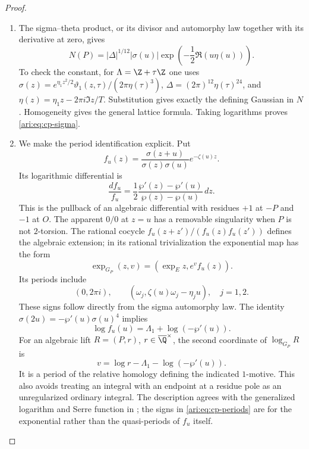 \begin{proof}
\begin{enumerate}[label=\arabic*.,leftmargin=*]
\item The sigma--theta product, or its divisor and automorphy law
together with its derivative at zero, gives
\begin{equation}\label{ari:eq:cp-klein}
 N(P)=|\Delta|^{1/12}|\sigma(u)|
                   \exp\!\left(-\frac12\Re(u\eta(u))\right).
\end{equation}
To check the constant, for $\Lambda=\Z+\tau\Z$ one uses
$\sigma(z)=e^{\eta_1z^2/2}\vartheta_1(z,\tau)/(2\pi\eta(\tau)^3)$,
$\Delta=(2\pi)^{12}\eta(\tau)^{24}$, and
$\eta(z)=\eta_1z-2\pi i\Im z/T$. Substitution gives exactly
the defining Gaussian in $N$. Homogeneity gives the general
lattice formula. Taking logarithms proves \eqref{ari:eq:cp-sigma}.

\item We make the period identification explicit. Put
\[
 f_u(z)=\frac{\sigma(z+u)}{\sigma(z)\sigma(u)}e^{-\zeta(u)z}.
\]
Its logarithmic differential is
\[
 \frac{df_u}{f_u}
 =\frac12\frac{\wp'(z)-\wp'(u)}{\wp(z)-\wp(u)}\,dz.
\]
This is the pullback of an algebraic differential with residues
$+1$ at $-P$ and $-1$ at $O$. The apparent $0/0$ at $z=u$
has a removable singularity when $P$ is not $2$-torsion.
The rational cocycle $f_u(z+z')/(f_u(z)f_u(z'))$ defines
the algebraic extension; in its rational trivialization the
exponential map has the form
\[
 \exp_{G_P}(z,v)=(\exp_E z,e^v f_u(z)).
\]
Its periods include
\begin{equation}\label{ari:eq:cp-periods}
 (0,2\pi i),\qquad
 (\omega_j,\zeta(u)\omega_j-\eta_j u),\quad j=1,2.
\end{equation}
These signs follow directly from the sigma automorphy law.
The identity
$\sigma(2u)=-\wp'(u)\sigma(u)^4$ implies
\[
 \log f_u(u)=\Lambda_1+\log(-\wp'(u)).
\]
For an algebraic lift $R=(P,r)$, $r\in\overline\Q^{\times}$,
the second coordinate of $\log_{G_P}R$ is
\begin{equation}\label{ari:eq:cp-v}
 v=\log r-\Lambda_1-\log(-\wp'(u)).
\end{equation}
It is a period of the relative homology defining the indicated
$1$-motive. This also avoids treating an integral with an endpoint
at a residue pole as an unregularized ordinary integral.
The description agrees with the generalized logarithm and
Serre function in \citet[Definitions 2.3--2.4 and
Section 6]{bertolin2022}; the signs in
\eqref{ari:eq:cp-periods} are for the exponential rather than the
quasi-periods of $f_u$ itself.
\end{enumerate}
\end{proof}


